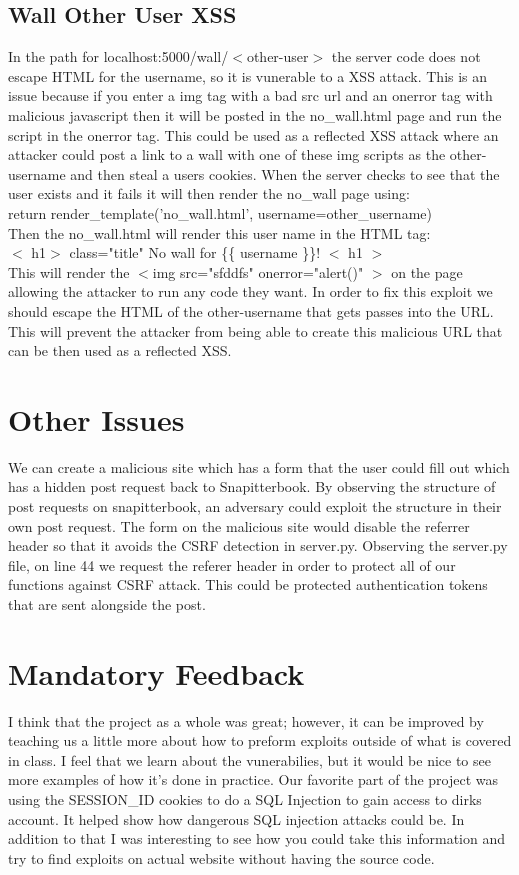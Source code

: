 \documentclass[12pt]{article}
\begin{document}
\subsection{Wall Other User XSS}
In the path for localhost:5000/wall/$<$other-user$>$ the server code does not escape HTML for the username, so it is vunerable to a XSS attack. This is an issue because if you enter a img tag with a bad src url and an onerror tag with malicious javascript then it will be posted in the no\_wall.html page and run the script in the onerror tag. This could be used as a reflected XSS attack where an attacker could post a link to a wall with one of these img scripts as the other-username and then steal a users cookies. When the server checks to see that the user exists and it fails it will then render the no\_wall page using: \\
	return render\_template('no\_wall.html', username=other\_username) \\
Then the no\_wall.html will render this user name in the HTML tag:\\
$<$ h1$>$ class="title"  No wall for \{\{ username \}\}! $<$ \/h1 $>$\\
This will render the $<$img src="sfddfs" onerror="alert()" $>$ on the page allowing the attacker to run any code they want. In order to fix this exploit we should escape the HTML of the other-username that gets passes into the URL. This will prevent the attacker from being able to create this malicious URL that can be then used as a reflected XSS.
\section{Other Issues}
We can create a malicious site which has a form that the user could fill out which has a hidden post request back to Snapitterbook.  By observing the structure of post requests on snapitterbook, an adversary could exploit the structure in their own post request.  The form on the malicious site would disable the referrer header so that it avoids the CSRF detection in server.py.  Observing the server.py file, on line 44 we request the referer header in order to protect all of our functions against CSRF attack.  This could be protected authentication tokens that are sent alongside the post.



\section{Mandatory Feedback}
I think that the project as a whole was great; however, it can be improved by teaching us a little more about how to preform exploits outside of what is covered in class. I feel that we learn about the vunerabilies, but it would be nice to see more examples of how it's done in practice. Our favorite part of the project was using the SESSION\_ID cookies to do a SQL Injection to gain access to dirks account. It helped show how dangerous SQL injection attacks could be. In addition to that I was interesting to see how you could take this information and try to find exploits on actual website without having the source code.
\end{document}
